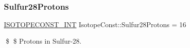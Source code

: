 \subsubsection{\texorpdfstring{Sulfur28\+Protons}{Sulfur28Protons}}
{\footnotesize\ttfamily \mbox{\hyperlink{group___isotope_const-_macros_ga5f18360b3e99483a35c32d789e62621c}{I\+S\+O\+T\+O\+P\+E\+C\+O\+N\+S\+T\+\_\+\+I\+NT}} Isotope\+Const\+::\+Sulfur28\+Protons = 16}

\$ \$ Protons in Sulfur-\/28. 